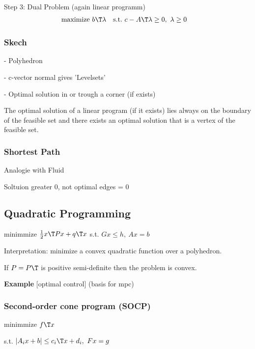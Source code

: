 Step 3: Dual Problem (again linear programm)
\begin{equation}
	\begin{aligned}
		\operatorname{maximize}\  & b\T\lambda & \text{s.t.}\  & c-A\T\lambda \ge 0,\ \lambda\ge0
	\end{aligned}
\end{equation}

\subsubsection{Skech}

- Polyhedron

- c-vector normal gives 'Levelsets'

- Optimal solution in or trough a corner (if exists)

\begin{proposition}
	The optimal solution of a linear program (if it exists)
	lies always on the boundary of the feasible set
	and there exists an optimal solution that is a vertex of the feasible set.
\end{proposition}

\subsubsection{Shortest Path}

Analogie with Fluid

Soltuion greater 0, not optimal edges = 0

\subsection{Quadratic Programming}

minimmize $\frac{1}{2}x\T Px+q\T x$
s.t. $Gx\le h,\ Ax=b$

Interpretation: minimize a convex quadratic function over a polyhedron.

If $P=P\T$ is positive semi-definite
then the problem is convex.

\textbf{Example} [optimal control] (basis for mpc)

\subsubsection{Second-order cone program (SOCP)}

minimmize $f\T x$

s.t. $|A_ix+b|\le c_i\T x+d_i,\ Fx=g$

